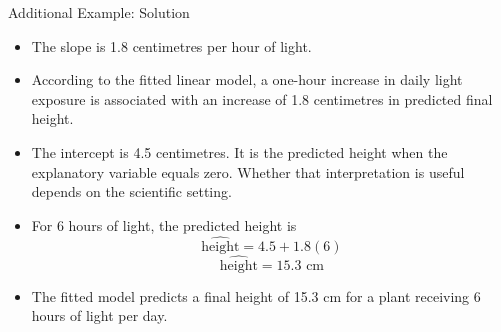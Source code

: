 \documentclass[aspectratio=169]{beamer}
\begin{document}
\begin{frame}{Additional Example: Solution}
\begin{itemize}
	\item The slope is 1.8 centimetres per hour of light.
	\item According to the fitted linear model, a one-hour increase in daily light exposure is associated with an increase of 1.8 centimetres in predicted final height.
	\item The intercept is 4.5 centimetres. It is the predicted height when the explanatory variable equals zero. Whether that interpretation is useful depends on the scientific setting.
	\item For 6 hours of light, the predicted height is
	$$\widehat{\text{height}}=4.5+1.8(6)$$
	$$\widehat{\text{height}}=15.3\text{ cm}$$
	\item The fitted model predicts a final height of 15.3 cm for a plant receiving 6 hours of light per day.
\end{itemize}
\end{frame}

\end{document}
